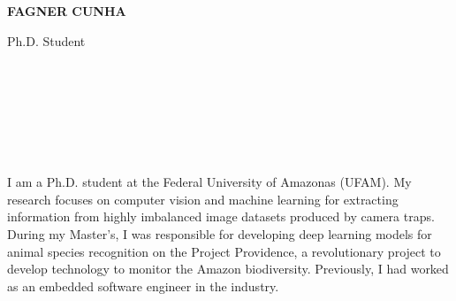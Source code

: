 \documentclass[10pt]{developercv} %
\begin{document}
\begin{minipage}[t]{0.6\textwidth}
  \vspace{-\baselineskip} %

  {\HUGE\textbf{\MakeUppercase{Fagner Cunha}}}
  \vspace{5pt}

  {\huge Ph.D. Student} %

  \\

\end{minipage}
\begin{minipage}[t]{0.3\textwidth}
  \vspace{-\baselineskip} %

  \\
 \\
\\ \\
\end{minipage}



\begin{minipage}[t]{\textwidth}

I am a Ph.D. student at the Federal University of Amazonas (UFAM). My research 
focuses on computer vision and machine learning for extracting information from 
highly imbalanced image datasets produced by camera traps. During my Master's, I 
was responsible for developing deep learning models for animal species 
recognition on the Project Providence, a revolutionary project to develop 
technology to monitor the Amazon biodiversity. Previously, I had worked as an 
embedded software engineer in the industry.

\end{minipage}

\end{document}
